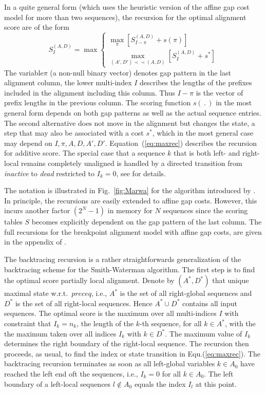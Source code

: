 \documentclass[a4paper,10pt]{article}
\newcommand{\pprec}{\mathrel{\prec\!\!\!\prec}}
\begin{document}
In a quite general form (which uses the heuristic version of the affine gap
cost model for more than two sequences), the recursion for the optimal
alignment score are of the form
\begin{equation} 
  S^{(A,D)}_I = \max 
      \begin{cases}
        \displaystyle\max_{\pi} 
            \left[ S^{(A,D)}_{I-\pi} + s(\pi)
                    \right]
        \\
        \displaystyle\max_{(A',D')\pprec(A,D)}  
                    \left[ S^{(A,D)}_I + s^*\right]
       \end{cases} 
\label{eq:maxrec}
\end{equation}
The variable$\pi$ (a non-null binary vector) denotes gap pattern in the
last alignment column, the lower multi-index $I$ describes the lengths of
the prefixes included in the alignment including this column.  Thus $I-\pi$
is the vector of prefix lengths in the previous column. The scoring
function $s(\,.\,)$ in the most general form depends on both gap patterns
as well as the actual sequence entries. The second alternative does not
move in the alignment but changes the state, a step that may also be
associated with a cost $s^*$, which in the most general case may depend on
$I,\pi,A,D,A',D'$. Equation~(\ref{eq:maxrec}) describes the recursion for
additive score. The special case that a sequence $k$ that is both left- and
right-local remains completely unaligned is handled by a directed
transition from \textit{inactive} to \textit{dead} restricted to $I_k=0$,
see \citet{Retzlaff:18a} for details.

The notation is illustrated in Fig.~\ref{fig:Marwa} for the algorithm
introduced by \citet{AlArab:17a}. In principle, the recursions are easily
extended to affine gap costs. However, this incurs another factor $(2^N-1)$
in memory for $N$ sequences since the scoring tables $S$ becomes explicitly
dependent on the gap pattern of the last column. The full recursions for
the breakpoint alignment model with affine gap costs, are given in the
appendix of \citet{Retzlaff:18a}.

The backtracing recursion is a rather straightforwards generalization of
the backtracing scheme for the Smith-Waterman algorithm. The first step is
to find the optimal score partially local alignment. Denote by $(A^*,D^*)$
that unique maximal state w.r.t.\ $preceq$, i.e., $A^*$ is the set of all
right-global sequences and $D^*$ is the set of all right-local
sequences. Hence $A^*\cup D^*$ contains all input sequences.  The optimal
score is the maximum over all multi-indices $I$ with constraint that
$I_k=n_k$, the length of the $k$-th sequence, for all $k\in A^*$, with the
the maximum taken over all indices $I_k$ with $k\in D^*$.  The maximum
value of $I_k$ determines the right boundary of the right-local sequence.
The recursion then proceeds, as usual, to find the index or state
transition in Equ.(\ref{eq:maxrec}). The backtracing recursion terminates
as soon as all left-global variables $k\in A_0$ have reached the left end
oft the sequences, i.e., $I_k=0$ for all $k\in A_0$.  The left boundary of
a left-local sequences $l\notin A_0$ equals the index $I_l$ at this point.
\end{document}
